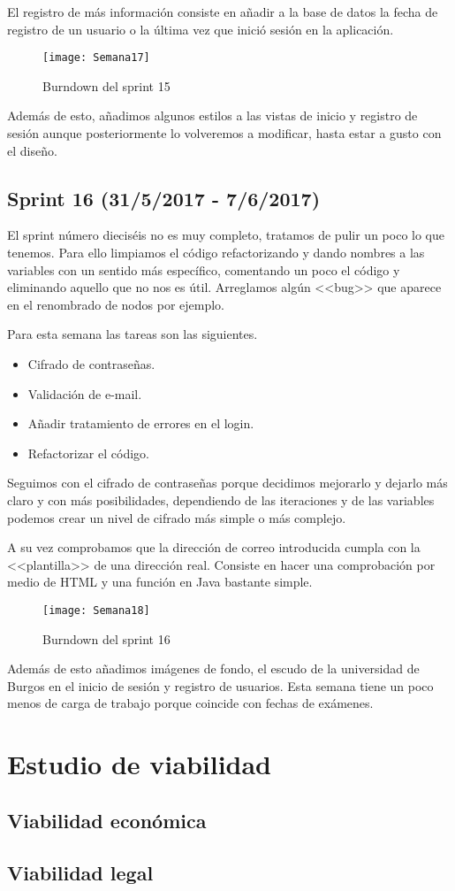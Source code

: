 El registro de más información consiste en añadir a la base de datos la fecha de registro de un usuario o la última vez que inició sesión en la aplicación.

\begin{figure}[h]
\centering
\texttt{[image: Semana17]}
\caption{Burndown del sprint 15}
\label{fig:A.14}
\end{figure}

Además de esto, añadimos algunos estilos a las vistas de inicio y registro de sesión aunque posteriormente lo volveremos a modificar, hasta estar a gusto con el diseño.

\subsection{Sprint 16 (31/5/2017 - 7/6/2017)}

El sprint número dieciséis no es muy completo, tratamos de pulir un poco lo que tenemos. Para ello limpiamos el código refactorizando y dando nombres a las variables con un sentido más específico, comentando un poco el código y eliminando aquello que no nos es útil. Arreglamos algún <<bug>> que aparece en el renombrado de nodos por ejemplo.


Para esta semana las tareas son las siguientes.
\begin{itemize}
\item Cifrado de contraseñas.
\item Validación de e-mail.
\item Añadir tratamiento de errores en el login.
\item Refactorizar el código.
\end{itemize}

Seguimos con el cifrado de contraseñas porque decidimos mejorarlo y dejarlo más claro y con más posibilidades, dependiendo de las iteraciones y de las variables podemos crear un nivel de cifrado más simple o más complejo. 

A su vez comprobamos que la dirección de correo introducida cumpla con la <<plantilla>> de una dirección real. Consiste en hacer una comprobación por medio de HTML y una función en Java bastante simple.

\begin{figure}[h]
\centering
\texttt{[image: Semana18]}
\caption{Burndown del sprint 16}
\label{fig:A.15}
\end{figure}

Además de esto añadimos imágenes de fondo, el escudo de la universidad de Burgos en el inicio de sesión y registro de usuarios. Esta semana tiene un poco menos de carga de trabajo porque coincide con fechas de exámenes.


\section{Estudio de viabilidad}

\subsection{Viabilidad económica}

\subsection{Viabilidad legal}


